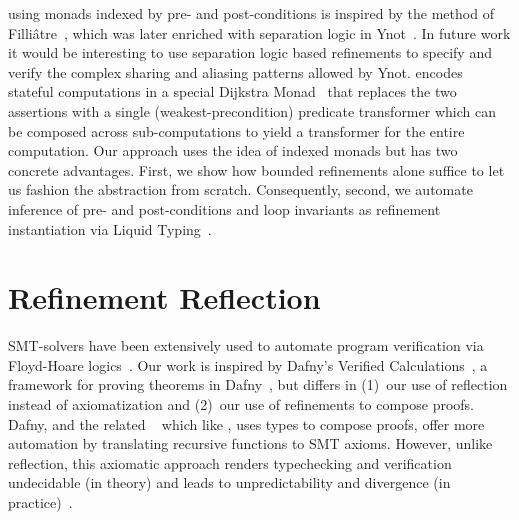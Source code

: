  using monads
indexed by pre- and post-conditions is inspired by the method of
Filli\^atre~\citep{Filliatre98}, which was later enriched with
separation logic in Ynot~\citep{ynot}. In future work it would
be interesting to use separation logic based refinements to specify
and verify the complex sharing and aliasing patterns allowed by Ynot.
%
\fstar encodes stateful computations in a special Dijkstra
Monad~\citep{dijkstramonad} that replaces the two assertions with
a single (weakest-precondition) predicate transformer which
can be composed across sub-computations to yield a transformer
for the entire computation.
%
Our \RIO approach uses the idea of indexed monads but
has two concrete advantages.
%
First, we show how bounded refinements alone suffice to
let us fashion the \RIO abstraction from scratch.
%
Consequently, second, we automate inference of pre- and
post-conditions and loop invariants as refinement instantiation
via Liquid Typing~\citep{LiquidPLDI08}.


\section{Refinement Reflection}\label{sec:refinementreflection:related}


%
SMT-solvers have been extensively used to automate
program verification via Floyd-Hoare logics~\cite{Nelson81}.
%
Our work is inspired by Dafny's Verified
Calculations~\citep{LeinoPolikarpova16},
a framework for proving theorems in
Dafny~\citep{dafny}, but differs in
%
(1)~our use of reflection instead of axiomatization and
(2)~our use of refinements to compose proofs.
%
Dafny, and the related \fstar~\citep{fstar}
which like \toolname, uses types to compose
proofs, offer more automation by translating
recursive functions to SMT axioms.
However, unlike reflection, this axiomatic
approach renders typechecking and verification
undecidable (in theory) and leads to
unpredictability and divergence
(in practice)~\citep{Leino16}.



